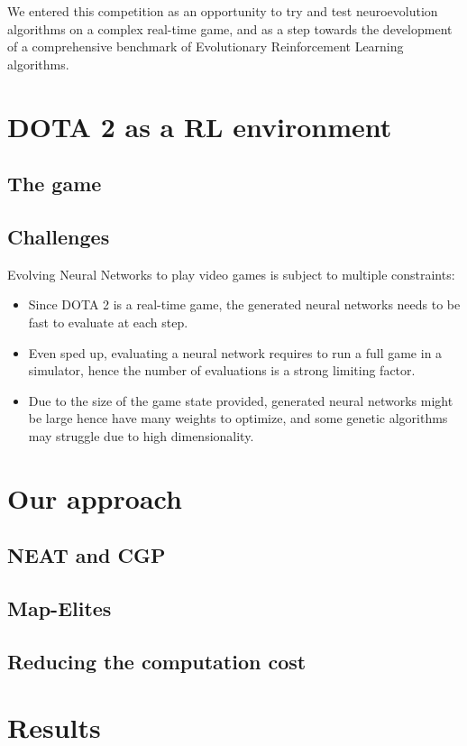 We entered this competition as an opportunity to try and test neuroevolution algorithms on a complex real-time game, and as a step towards the development of a comprehensive benchmark of Evolutionary Reinforcement Learning algorithms.

\section{DOTA 2 as a RL environment}
\subsection{The game}

\subsection{Challenges}
Evolving Neural Networks to play video games is subject to multiple constraints:
\begin{itemize}
    \item Since DOTA 2 is a real-time game, the generated neural networks needs to be fast to evaluate at each step.
    \item Even sped up, evaluating a neural network requires to run a full game in a simulator, hence the number of evaluations is a strong limiting factor.
    \item Due to the size of the game state provided, generated neural networks might be large hence have many weights to optimize, and some genetic algorithms may struggle due to high dimensionality.
\end{itemize}



\section{Our approach}
\subsection{NEAT and CGP}
\subsection{Map-Elites}
\subsection{Reducing the computation cost}

\section{Results}

